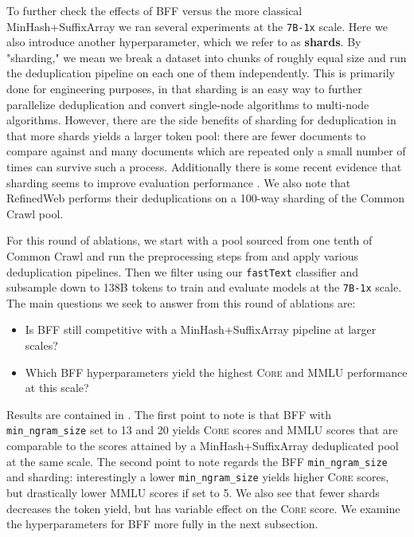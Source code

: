 \documentclass{article}
\newcommand{\ltrack}{\texttt{7B-1x}\xspace}
\newcommand{\fasttext}{\texttt{fastText}\xspace}
\newcommand{\lowvar}{\textsc{Core}\xspace}
\newcommand{\commoncrawl}{Common Crawl\xspace}
\begin{document}
To further check the effects of BFF versus the more classical MinHash+SuffixArray we ran several experiments at the \ltrack scale. Here we also introduce another hyperparameter, which we refer to as \textbf{shards}. By "sharding," we mean we break a dataset into chunks of roughly equal size and run the deduplication pipeline on each one of them independently. This is primarily done for engineering purposes, in that sharding is an easy way to further parallelize deduplication and convert single-node algorithms to multi-node algorithms. However, there are the side benefits of sharding for deduplication in that more shards yields a larger token pool: there are fewer documents to compare against and many documents which are repeated only a small number of times can survive such a process. Additionally there is some recent evidence that sharding seems to improve evaluation performance \citep{penedo2024fineweb}. We also note that RefinedWeb \citep{refinedweb} performs their deduplications on a 100-way sharding of the \commoncrawl pool.

For this round of ablations, we start with a pool sourced from one tenth of \commoncrawl and run the preprocessing steps from \citet{refinedweb} and apply various deduplication pipelines. Then we filter using our \fasttext classifier and subsample down to 138B tokens to train and evaluate models at the \ltrack scale. The main questions we seek to answer from this round of ablations are:
\begin{itemize}
    \item Is BFF still competitive with a MinHash+SuffixArray pipeline at larger scales?
    \item Which BFF hyperparameters yield the highest \lowvar and MMLU performance at this scale?
\end{itemize}
Results are contained in . The first point to note is that BFF with \texttt{min\_ngram\_size} set to 13 and 20 yields \lowvar scores and MMLU scores that are comparable to the scores attained  by a MinHash+SuffixArray deduplicated pool at the same scale. The second point to note regards the BFF \texttt{min\_ngram\_size} and sharding: interestingly a lower \texttt{min\_ngram\_size} yields higher \lowvar scores, but drastically lower MMLU scores if set to 5. We also see that fewer shards decreases the token yield, but has variable effect on the \lowvar score. We examine the hyperparameters for BFF more fully in the next subsection.
\end{document}
